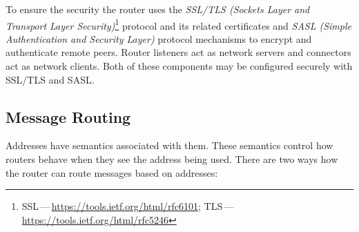 
To ensure the security the router uses the \emph{SSL/TLS (Sockets Layer and Transport Layer Security)}\footnote{SSL\,---\,\url{https://tools.ietf.org/html/rfc6101}; TLS\,---\,\url{https://tools.ietf.org/html/rfc5246}} protocol and its related certificates and \emph{SASL (Simple Authentication and Security Layer)}\footnotemark{} protocol mechanisms to encrypt and authenticate remote peers. Router listeners act as network servers and connectors act as network clients. Both of these components may be configured securely with SSL/TLS and SASL.



\subsection{Message Routing}
\label{Message Routing}
Addresses have semantics associated with them. These semantics control how routers behave when they see the address being used. There are two ways how the router can route messages based on addresses:

